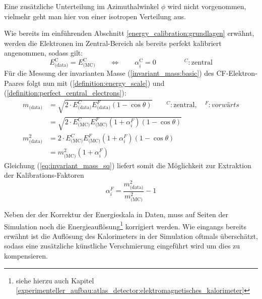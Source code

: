 Eine zusätzliche Unterteilung im Azimuthalwinkel $\phi$ wird nicht
vorgenommen, vielmehr geht man hier von einer isotropen Verteilung aus.
\newline

Wie bereits im einführenden Abschnitt \ref{energy_calibration:grundlagen}
erwähnt, werden die Elektronen im Zentral-Bereich als bereits perfekt
kalibriert angenommen, sodass gilt:
\begin{equation}
    \label{definition:perfect_central_electrons}
    E_\text{(data)}^\text{C} = E_\text{(MC)}^\text{C}
    \qquad \Longleftrightarrow \qquad
    \alpha_i^\text{C} = 0
    \qquad\qquad
    ^C : \text{zentral}
\end{equation}
Für die Messung der invarianten Masse (\ref{invariant_mass:basic}) des
\acs{CF}-Elektron-Paares folgt nun mit (\ref{definition:energy_scale}) und
(\ref{definition:perfect_central_electrons}):
\begin{align}
    m_\text{(data)}   &= \sqrt{ 2 \cdot E^C_\text{(data)} E^F_{\text{(data)}}
                         (1-\cos\theta)} 
                         \qquad ^C: \text{zentral}, \quad ^F: vorwärts
                         \nonumber \\[5pt]
                      &= \sqrt{ 2 \cdot E^C_\text{(MC)} E^F_{\text{(MC)}}
                         (1+\alpha^F_i)(1-\cos\theta)}
                         \nonumber \\[15pt]
    m^2_\text{(data)} &= 2 \cdot E^C_\text{(MC)} E^F_{\text{(MC)}}
                         (1+\alpha^F_i)(1-\cos\theta)
                         \nonumber \\[5pt]
                      &= m^2_\text{(MC)} (1+\alpha^F_i)
                         \label{eq:invariant_mass_sq}
\end{align}
Gleichung (\ref{eq:invariant_mass_sq}) liefert somit die Möglichkeit zur
Extraktion der Kalibrations-Faktoren
\begin{equation}
    \label{eq:extraction_alpha}
    \alpha_i^F = \frac{m^2_\text{(data)}}{m^2_\text{(MC)}} - 1
\end{equation}

Neben der der Korrektur der Energieskala in Daten, muss auf Seiten der
Simulation noch die Energieauflösung\footnote{siehe hierzu auch Kapitel
\ref{experimenteller_aufbau:atlas_detector:elektromagnetisches_kalorimeter}}
korrigiert werden. Wie eingangs bereits erwähnt ist die Auflösung des
Kalorimeters in der Simulation oftmals überschätzt, sodass eine zusätzliche
künstliche Verschmierung eingeführt wird um dies zu kompensieren.

